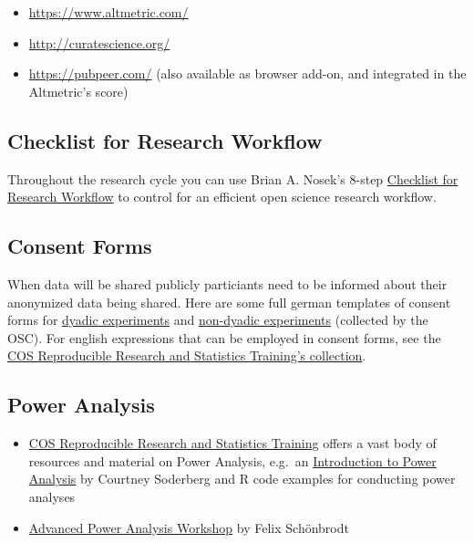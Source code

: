 \documentclass[12pt,]{report}
\providecommand{\tightlist}{%
  \setlength{\itemsep}{0pt}\setlength{\parskip}{0pt}}
\begin{document}
\begin{itemize}
\tightlist
\item
  \url{https://www.altmetric.com/}
\item
  \url{http://curatescience.org/}
\item
  \url{https://pubpeer.com/} (also available as browser add-on, and
  integrated in the Altmetric's score)
\end{itemize}

\subsection{Checklist for Research
Workflow}\label{checklist-for-research-workflow}

Throughout the research cycle you can use Brian A. Nosek's 8-step
\href{https://osf.io/mv8pj/wiki/home/}{Checklist for Research Workflow}
to control for an efficient open science research workflow.

\subsection{Consent Forms}\label{consent-forms}

When data will be shared publicly particiants need to be informed about
their anonymized data being shared. Here are some full german templates
of consent forms for \href{https://osf.io/3d5xb/}{dyadic experiments}
and \href{https://osf.io/kv37u/}{non-dyadic experiments} (collected by
the OSC). For english expressions that can be employed in consent forms,
see the \href{https://osf.io/g4jfv/wiki/home/}{COS Reproducible Research
and Statistics Training's collection}.

\subsection{Power Analysis}\label{power-analysis}

\begin{itemize}
\tightlist
\item
  \href{https://osf.io/adkj4/}{COS Reproducible Research and Statistics
  Training} offers a vast body of resources and material on Power
  Analysis, e.g.~an \href{https://osf.io/asf53/}{Introduction to Power
  Analysis} by Courtney Soderberg and R code examples for conducting
  power analyses
\item
  \href{https://osf.io/d76gc/}{Advanced Power Analysis Workshop} by
  Felix Schönbrodt
\end{itemize}
\end{document}
